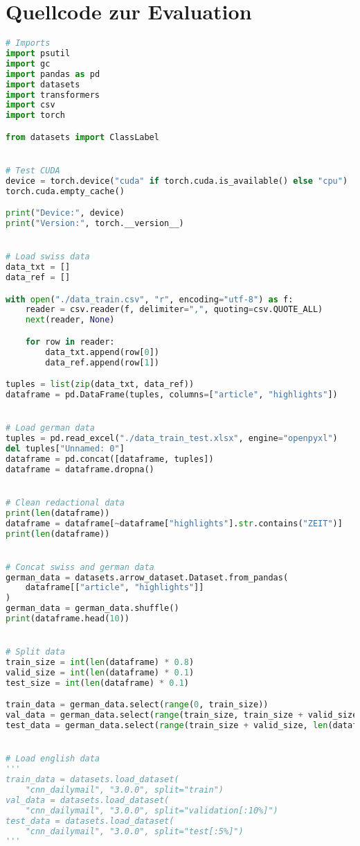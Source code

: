 \section*{Quellcode zur Evaluation}
\begin{lstlisting}[language=Python, caption=Quellcode zur Evaluation]
# Imports
import psutil
import gc
import pandas as pd
import datasets
import transformers
import csv
import torch

from datasets import ClassLabel


# Test CUDA
device = torch.device("cuda" if torch.cuda.is_available() else "cpu")
torch.cuda.empty_cache()

print("Device:", device)
print("Version:", torch.__version__)


# Load swiss data
data_txt = []
data_ref = []

with open("./data_train.csv", "r", encoding="utf-8") as f:
    reader = csv.reader(f, delimiter=",", quoting=csv.QUOTE_ALL)
    next(reader, None)

    for row in reader:
        data_txt.append(row[0])
        data_ref.append(row[1])

tuples = list(zip(data_txt, data_ref))
dataframe = pd.DataFrame(tuples, columns=["article", "highlights"])


# Load german data
tuples = pd.read_excel("./data_train_test.xlsx", engine="openpyxl")
del tuples["Unnamed: 0"]
dataframe = pd.concat([dataframe, tuples])
dataframe = dataframe.dropna()


# Clean redactional data
print(len(dataframe))
dataframe = dataframe[~dataframe["highlights"].str.contains("ZEIT")]
print(len(dataframe))


# Concat swiss and german data
german_data = datasets.arrow_dataset.Dataset.from_pandas(
    dataframe[["article", "highlights"]]
)
german_data = german_data.shuffle()
print(dataframe.head(10))


# Split data
train_size = int(len(dataframe) * 0.8)
valid_size = int(len(dataframe) * 0.1)
test_size = int(len(dataframe) * 0.1)

train_data = german_data.select(range(0, train_size))
val_data = german_data.select(range(train_size, train_size + valid_size))
test_data = german_data.select(range(train_size + valid_size, len(dataframe)))


# Load english data
'''
train_data = datasets.load_dataset(
    "cnn_dailymail", "3.0.0", split="train")
val_data = datasets.load_dataset(
    "cnn_dailymail", "3.0.0", split="validation[:10%]")
test_data = datasets.load_dataset(
    "cnn_dailymail", "3.0.0", split="test[:5%]")
'''



\end{lstlisting}

